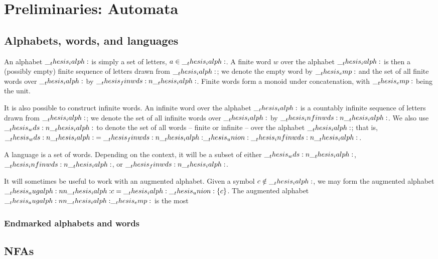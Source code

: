 \chapter{Preliminaries: Automata}\label{ch:automata}

\section{Alphabets, words, and languages}

An alphabet $\__thesis_ialph:$ is simply a set of letters, $a \in \__thesis_ialph:$.
A finite word $w$ over the alphabet $\__thesis_ialph:$ is then a (possibly empty) finite sequence of letters drawn from $\__thesis_ialph:$;
we denote the empty word by $\__thesis_emp:$ and the set of all finite words over $\__thesis_ialph:$ by $\__thesis_finwds:n {\__thesis_ialph:}$.
Finite words form a monoid under concatenation, with $\__thesis_emp:$ being the unit.

It is also possible to construct infinite words.
An infinite word over the alphabet $\__thesis_ialph:$ is a countably infinite sequence of letters drawn from $\__thesis_ialph:$;
we denote the set of all infinite words over $\__thesis_ialph:$ by $\__thesis_infinwds:n {\__thesis_ialph:}$.
We also use $\__thesis_wds:n {\__thesis_ialph:}$ to denote the set of all words -- finite or infinite -- over the alphabet $\__thesis_ialph:$; that is, $\__thesis_wds:n {\__thesis_ialph:} = \__thesis_finwds:n {\__thesis_ialph:} \__thesis_union: \__thesis_infinwds:n {\__thesis_ialph:}$.

A language is a set of words.
Depending on the context, it will be a subset of either $\__thesis_wds:n {\__thesis_ialph:}$, $\__thesis_infinwds:n {\__thesis_ialph:}$, or $\__thesis_finwds:n {\__thesis_ialph:}$.

It will sometimes be useful to work with an augmented alphabet.
Given a symbol $c \notin \__thesis_ialph:$, we may form the augmented alphabet $\__thesis_augalph:nn {\__thesis_ialph:} {c} = \__thesis_ialph: \__thesis_union: \{c\}$.
The augmented alphabet $\__thesis_augalph:nn {\__thesis_ialph:} {\__thesis_emp:}$ is the most

\subsection{Endmarked alphabets and words}


\section{\Aclp*{NFA}}

